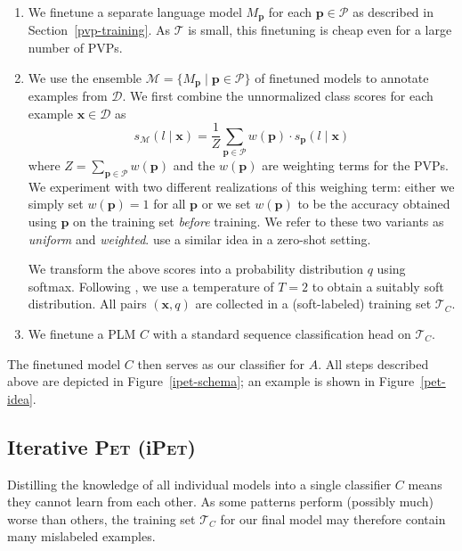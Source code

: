 \begin{enumerate}
\item[\textbf{(1)}] We finetune a separate language model $M_\mathbf{p}$
  for each $\mathbf{p} \in \mathcal{P}$ as described in Section~\ref{pvp-training}. As
  $\mathcal{T}$ is small, this finetuning is cheap even for a large number of PVPs.
\item[\textbf{(2)}]  We use the ensemble $\mathcal{M} = \{ M_\mathbf{p} \mid \mathbf{p} \in \mathcal{P} \}$ of finetuned models to annotate examples from $\mathcal{D}$. We first combine the unnormalized class scores for each example $\mathbf{x} \in \mathcal{D}$ as
\[
{s}_\mathcal{M}(l \mid \mathbf{x}) = \frac{1}{Z} \sum_{\mathbf{p} \in \mathcal{P}} w(\mathbf{p}) \cdot s_\mathbf{p}(l \mid \mathbf{x})
\]
where $Z = \sum_{\mathbf{p} \in \mathcal{P}} w(\mathbf{p})$
and the $w(\mathbf{p})$ are weighting terms for the PVPs. We experiment with two different realizations of this weighing term: either we simply set $w(\mathbf{p}) = 1$ for all $\mathbf{p}$ or we set $w(\mathbf{p})$ to be the accuracy obtained using $\mathbf{p}$ on the training set
\emph{before} training. We refer to these two variants as
\emph{uniform} and \emph{weighted}.
\citet{jiang2019know} use a similar idea in a zero-shot setting.

We transform the above scores into a probability distribution $q$ using softmax. Following
  \citet{hinton2015distilling}, we use a temperature of $T=2$ to obtain a suitably soft distribution. All pairs $(\mathbf{x}, q)$ are collected in a (soft-labeled) training set $\mathcal{T}_C$.

\item[\textbf{(3)}]  We finetune a PLM $C$ with a standard sequence classification head on $\mathcal{T}_C$.
\end{enumerate}

The finetuned model $C$ then serves as our classifier for $A$. All steps described above are depicted in Figure~\ref{ipet-schema}; an example is shown in Figure~\ref{pet-idea}.

\subsection{Iterative \textsc{Pet} (i\textsc{Pet})}
\label{ipet}

Distilling the knowledge of all individual models into a single classifier $C$ means they cannot learn from each other. As some patterns  perform (possibly much) worse than others,  the training set
$\mathcal{T}_C$ for our final model may therefore contain many mislabeled examples.

